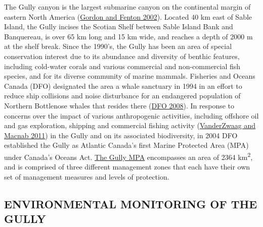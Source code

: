 \documentclass[12pt]{article}\usepackage[]{graphicx}\usepackage[]{color}
\begin{document}
The Gully canyon is the largest submarine canyon on the continental margin of eastern North America (\protect\hyperlink{ref-gordon_2002}{Gordon and Fenton 2002}). Located 40 km east of Sable Island, the Gully incises the Scotian Shelf between Sable Island Bank and Banquereau, is over 65 km long and 15 km wide, and reaches a depth of 2000 m at the shelf break. Since the 1990's, the Gully has been an area of special conservation interest due to its abundance and diversity of benthic features, including cold-water corals and various commercial and non-commercial fish species, and for its diverse community of marine mammals. Fisheries and Oceans Canada (DFO) designated the area a whale sanctuary in 1994 in an effort to reduce ship collisions and noise disturbance for an endangered population of Northern Bottlenose whales that resides there (\protect\hyperlink{ref-dfo_2008}{DFO 2008}). In response to concerns over the impact of various anthropogenic activities, including offshore oil and gas exploration, shipping and commercial fishing activity (\protect\hyperlink{ref-vanderzwaag_2011}{VanderZwaag and Macnab 2011}) in the Gully and on its associated biodiversity, in 2004 DFO established the Gully as Atlantic Canada's first Marine Protected Area (MPA) under Canada's Oceans Act. \href{https://www.dfo-mpo.gc.ca/oceans/mpa-zpm/gully/index-eng.html}{The Gully MPA} encompasses an area of 2364 km\textsuperscript{2}, and is comprised of three different management zones that each have their own set of management measures and levels of protection.

\hypertarget{environmental-monitoring-of-the-gully}{%
\subsection{\texorpdfstring{\textbf{ENVIRONMENTAL MONITORING OF THE GULLY}}{ENVIRONMENTAL MONITORING OF THE GULLY}}\label{environmental-monitoring-of-the-gully}}
\end{document}
